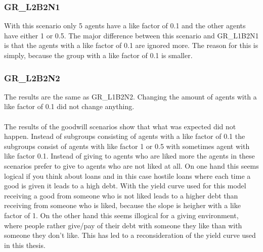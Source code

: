 \documentclass[twoside,openright]{uva-bachelor-thesis}
\begin{document}
\clearpage
\subsubsection{GR\_L2B2N1}
With this scenario only 5 agents have a like factor of 0.1 and the other agents have either 1 or 0.5. The major difference between this scenario and GR\_L1B2N1 is that the agents with a like factor of 0.1 are ignored more. The reason for this is simply, because the group with a like factor of 0.1 is smaller.
\subsubsection{GR\_L2B2N2}
The results are the same as GR\_L1B2N2. Changing the amount of agents with a like factor of 0.1 did not change anything.
\\
\\
The results of the goodwill scenarios show that what was expected did not happen. Instead of subgroups consisting of agents with a like factor of 0.1 the subgroups consist of agents with like factor 1 or 0.5 with sometimes agent with like factor 0.1. Instead of giving to agents who are liked more the agents in these scenarios prefer to give to agents who are not liked at all. On one hand this seems logical if you think about loans and in this case hostile loans where each time a good is given it leads to a high debt. With the yield curve used for this model receiving a good from someone who is not liked leads to a higher debt than receiving from someone who is liked, because the slope is heigher with a like factor of 1. On the other hand this seems illogical for a giving environment, where people rather give/pay of their debt with someone they like than with someone they don't like. This has led to a reconsideration of the yield curve used in this thesis.
\end{document}
